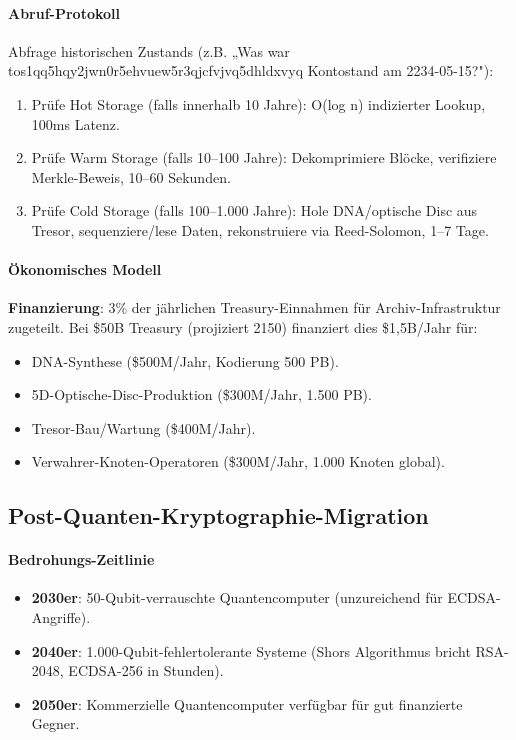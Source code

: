 \documentclass[11pt]{article}
\begin{document}
\paragraph{Abruf-Protokoll}
Abfrage historischen Zustands (z.B. „Was war tos1qq5hqy2jwn0r5ehvuew5r3qjcfvjvq5dhldxvyq Kontostand am 2234-05-15?"):
\begin{enumerate}[noitemsep]
  \item Prüfe Hot Storage (falls innerhalb 10 Jahre): O(log n) indizierter Lookup, 100ms Latenz.
  \item Prüfe Warm Storage (falls 10--100 Jahre): Dekomprimiere Blöcke, verifiziere Merkle-Beweis, 10--60 Sekunden.
  \item Prüfe Cold Storage (falls 100--1.000 Jahre): Hole DNA/optische Disc aus Tresor, sequenziere/lese Daten, rekonstruiere via Reed-Solomon, 1--7 Tage.
\end{enumerate}

\paragraph{Ökonomisches Modell}
\textbf{Finanzierung}: 3\% der jährlichen Treasury-Einnahmen für Archiv-Infrastruktur zugeteilt. Bei \$50B Treasury (projiziert 2150) finanziert dies \$1,5B/Jahr für:
\begin{itemize}[noitemsep]
  \item DNA-Synthese (\$500M/Jahr, Kodierung 500 PB).
  \item 5D-Optische-Disc-Produktion (\$300M/Jahr, 1.500 PB).
  \item Tresor-Bau/Wartung (\$400M/Jahr).
  \item Verwahrer-Knoten-Operatoren (\$300M/Jahr, 1.000 Knoten global).
\end{itemize}

\subsection{Post-Quanten-Kryptographie-Migration}

\paragraph{Bedrohungs-Zeitlinie}
\begin{itemize}[noitemsep]
  \item \textbf{2030er}: 50-Qubit-verrauschte Quantencomputer (unzureichend für ECDSA-Angriffe).
  \item \textbf{2040er}: 1.000-Qubit-fehlertolerante Systeme (Shors Algorithmus bricht RSA-2048, ECDSA-256 in Stunden).
  \item \textbf{2050er}: Kommerzielle Quantencomputer verfügbar für gut finanzierte Gegner.
\end{itemize}
\end{document}
